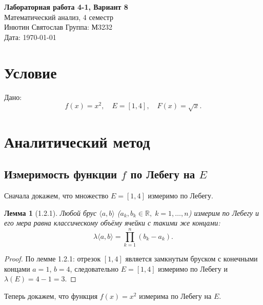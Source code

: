 \documentclass[12pt,a4paper]{article}
\newtheorem{lemma}{Лемма}
\theoremstyle{definition}
\begin{document}
\begin{center}
    {\Large \textbf{Лабораторная работа 4-1, Вариант 8}}\\[0.4em]
    {\normalsize Математический анализ, 4 семестр}\\[0.2em]
    {\normalsize Инютин Святослав \quad Группа: М3232}\\[0.2em]
    {\normalsize Дата: \today}
\end{center}
\vspace{1.5em}

\section*{Условие}

Дано:
\[
    f(x) = x^2, \quad E = [1,4], \quad F(x) = \sqrt{x}.
\]

\section{Аналитический метод}

\subsection{Измеримость функции $f$ по Лебегу на $E$}

Сначала докажем, что множество $E = [1,4]$ измеримо по Лебегу.

\begin{lemma}[1.2.1]
    Любой брус $\langle a, b \rangle$ ($a_k, b_k \in \mathbb{R},\; k = 1, \ldots, n$)
    измерим по Лебегу и его мера равна классическому объёму ячейки с такими же концами:
    \[
        \lambda\langle a, b \rangle = \prod_{k=1}^{n}(b_k - a_k).
    \]
\end{lemma}

\begin{proof}
    По лемме 1.2.1: отрезок $[1,4]$ является замкнутым бруском
    с конечными концами $a=1$, $b=4$, следовательно $E=[1,4]$ измеримо
    по Лебегу и $\lambda(E) = 4 - 1 = 3$.
\end{proof}

Теперь докажем, что функция $f(x) = x^2$ измерима по Лебегу на $E$.
\end{document}
